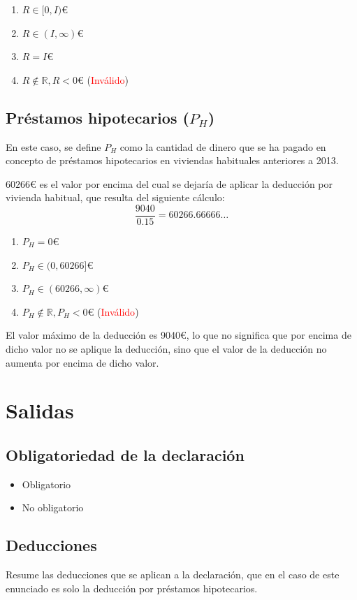 \begin{enumerate}
	\item $R \in [0, I)$€
	\item $R \in (I, \infty)$€
	\item $R = I$€
	\item $R \notin \mathbb{R}, R < 0$€ (\textcolor{red}{Inválido})
\end{enumerate}

\subsection{Préstamos hipotecarios ($P_{H}$)}
En este caso, se define $P_{H}$ como la cantidad de dinero que se ha pagado
en concepto de préstamos hipotecarios en viviendas habituales anteriores a 2013.

$60266$€ es el valor por encima del cual se dejaría de aplicar la deducción por vivienda habitual,
que resulta del siguiente cálculo: $$\frac{9040}{0.15} = 60266.66666\dots$$

\begin{enumerate}
	\item $P_{H} = 0$€
	\item $P_{H} \in (0, 60266]$€
	\item $P_{H} \in (60266, \infty)$€
	\item $P_{H} \notin \mathbb{R}, P_{H} < 0$€ (\textcolor{red}{Inválido})
\end{enumerate}

El valor máximo de la deducción es 9040€, lo que no significa que por encima de dicho valor no se aplique
la deducción, sino que el valor de la deducción no aumenta por encima de dicho valor.

\newpage{}
\section{Salidas}
\subsection{Obligatoriedad de la declaración}
\begin{itemize}
	\item Obligatorio
	\item No obligatorio
\end{itemize}

\subsection{Deducciones}
Resume las deducciones que se aplican a la declaración, que en el caso de este enunciado
es solo la deducción por préstamos hipotecarios.


